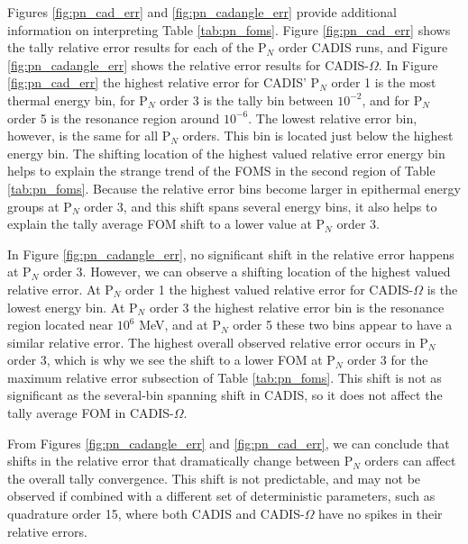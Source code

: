 Figures \ref{fig:pn_cad_err} and \ref{fig:pn_cadangle_err} provide additional
information on interpreting Table \ref{tab:pn_foms}. Figure \ref{fig:pn_cad_err}
shows the tally relative error results for each of the P$_N$ order CADIS runs,
and Figure
\ref{fig:pn_cadangle_err} shows the relative error results
for CADIS-$\Omega$. In Figure
\ref{fig:pn_cad_err} the highest relative error for CADIS'
P$_N$ order 1 is the most thermal energy bin, for P$_N$ order 3 is the tally bin
between $10^{-2}$, and for P$_N$ order 5 is the resonance region around
$10^{-6}$. The lowest relative error bin, however, is the same for all P$_N$
orders. This bin is located just below the highest energy bin. The shifting
location of the highest valued relative error energy bin helps to explain the
strange trend of the FOMS in the second region of Table \ref{tab:pn_foms}.
Because the relative error bins  become larger in epithermal
energy groups at P$_N$ order 3, and this shift spans several energy bins, it
also helps to explain the tally average FOM shift to a lower value at P$_N$
order 3.

In Figure \ref{fig:pn_cadangle_err}, no significant shift in the relative error
happens at P$_N$ order 3. However, we can observe a shifting location of the highest
valued relative error. At P$_N$ order 1 the highest valued relative error for
CADIS-$\Omega$ is the lowest energy bin. At P$_N$ order 3 the highest relative
error bin is the resonance region located near $10^{6}$ MeV,  and at P$_N$ order
5 these two bins appear to have a similar relative error. The highest overall
observed relative error occurs in P$_N$ order 3, which is why we see the shift
to a lower FOM at P$_N$ order 3 for the maximum relative error subsection of
Table \ref{tab:pn_foms}. This shift is not as significant as the several-bin
spanning shift in CADIS, so it does not affect the tally average FOM in
CADIS-$\Omega$.

From Figures \ref{fig:pn_cadangle_err} and \ref{fig:pn_cad_err}, we can conclude
that shifts in the relative error that dramatically change between P$_N$ orders
can affect the overall tally convergence. This shift is not predictable, and may
not be observed if combined with a different set of deterministic parameters,
such as quadrature order 15, where both CADIS and CADIS-$\Omega$ have no spikes
in their relative errors.

